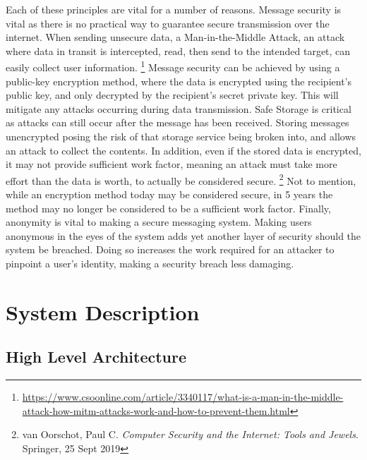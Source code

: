 \documentclass[titlepage]{article}
\begin{document}
      Each of these principles are vital for a number of reasons.
      Message security is vital as there is no practical way to guarantee secure transmission over the internet.
      When sending unsecure data, a Man-in-the-Middle Attack, an attack where data in transit is intercepted, read, then send to the intended target, can easily collect user information.
      \footnote{\url{https://www.csoonline.com/article/3340117/what-is-a-man-in-the-middle-attack-how-mitm-attacks-work-and-how-to-prevent-them.html}}
      Message security can be achieved by using a public-key encryption method, where the data is encrypted using the recipient's public key, and only decrypted by the recipient's secret private key.
      This will mitigate any attacks occurring during data transmission.
      Safe Storage is critical as attacks can still occur after the message has been received.
      Storing messages unencrypted posing the risk of that storage service being broken into, and allows an attack to collect the contents.
      In addition, even if the stored data is encrypted, it may not provide sufficient work factor, meaning an attack must take more effort than the data is worth, to actually be considered secure.
      \footnote{van Oorschot, Paul C. \textit{Computer Security and the Internet: Tools and Jewels}. Springer, 25 Sept 2019}
      Not to mention, while an encryption method today may be considered secure, in 5 years the method may no longer be considered to be a sufficient work factor.
      Finally, anonymity is vital to making a secure messaging system.
      Making users anonymous in the eyes of the system adds yet another layer of security should the system be breached.
      Doing so increases the work required for an attacker to pinpoint a user's identity, making a security breach less damaging.

    \section{System Description}

      \subsection{High Level Architecture}
\end{document}
